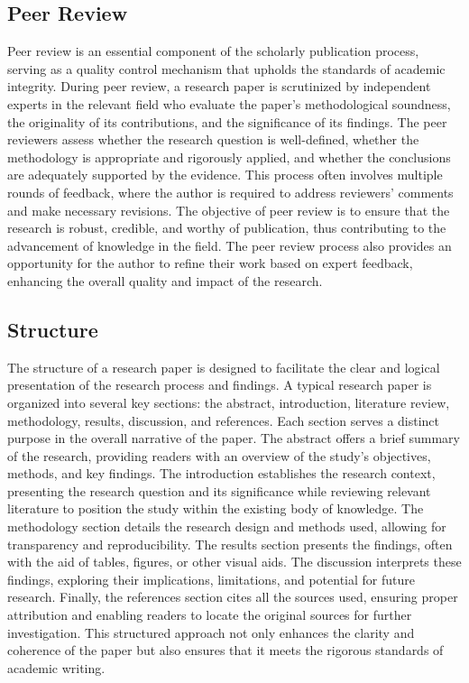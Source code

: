 \documentclass[
]{book}
\begin{document}
\subsection*{Peer Review}\label{peer-review}

Peer review is an essential component of the scholarly publication process, serving as a quality control mechanism that upholds the standards of academic integrity. During peer review, a research paper is scrutinized by independent experts in the relevant field who evaluate the paper's methodological soundness, the originality of its contributions, and the significance of its findings. The peer reviewers assess whether the research question is well-defined, whether the methodology is appropriate and rigorously applied, and whether the conclusions are adequately supported by the evidence. This process often involves multiple rounds of feedback, where the author is required to address reviewers' comments and make necessary revisions. The objective of peer review is to ensure that the research is robust, credible, and worthy of publication, thus contributing to the advancement of knowledge in the field. The peer review process also provides an opportunity for the author to refine their work based on expert feedback, enhancing the overall quality and impact of the research.

\subsection*{Structure}\label{structure}

The structure of a research paper is designed to facilitate the clear and logical presentation of the research process and findings. A typical research paper is organized into several key sections: the abstract, introduction, literature review, methodology, results, discussion, and references. Each section serves a distinct purpose in the overall narrative of the paper. The abstract offers a brief summary of the research, providing readers with an overview of the study's objectives, methods, and key findings. The introduction establishes the research context, presenting the research question and its significance while reviewing relevant literature to position the study within the existing body of knowledge. The methodology section details the research design and methods used, allowing for transparency and reproducibility. The results section presents the findings, often with the aid of tables, figures, or other visual aids. The discussion interprets these findings, exploring their implications, limitations, and potential for future research. Finally, the references section cites all the sources used, ensuring proper attribution and enabling readers to locate the original sources for further investigation. This structured approach not only enhances the clarity and coherence of the paper but also ensures that it meets the rigorous standards of academic writing.
\end{document}
